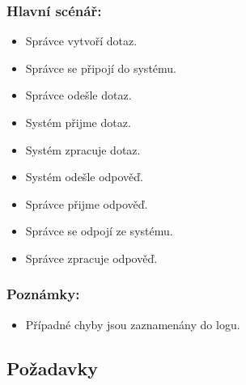 \subsubsection*{Hlavní scénář:}
\begin{itemize}
 \item Správce vytvoří dotaz.
 \item Správce se připojí do systému.
 \item Správce odešle dotaz.
 \item Systém přijme dotaz.
 \item Systém zpracuje dotaz.
 \item Systém odešle odpověď.
 \item Správce přijme odpověď.
 \item Správce se odpojí ze systému.
 \item Správce zpracuje odpověď.
\end{itemize}
\subsubsection*{Poznámky:}
\begin{itemize}
 \item Případné chyby jsou zaznamenány do logu.
\end{itemize}


\subsection{Požadavky}
